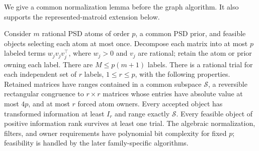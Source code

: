 We give a common normalization lemma before the graph algorithm. It also
supports the represented-matroid extension below.
\begin{lemma}
\label{lem:spectral-normalization}
Consider $m$ rational PSD atoms of order $p$, a common PSD prior, and feasible
objects selecting each atom at most once. Decompose each matrix into at most
$p$ labeled terms $w_jv_jv_j^\top$, where $w_j>0$ and $v_j$ are rational;
retain the atom or prior owning each label. There are $M\le p(m+1)$ labels.
There is a rational trial for each independent set of $r$ labels,
$1\le r\le p$, with the following properties. Retained matrices have ranges contained in a
common subspace $\mathcal S$, a reversible rectangular congruence to
$r\times r$ matrices whose entries have absolute value at most $4p$, and
at most $r$ forced atom owners. Every accepted object has transformed
information at least $I_r$ and range exactly $\mathcal S$. Every feasible
object of positive information rank survives at least one trial.
The algebraic normalization, filters, and owner requirements have polynomial
bit complexity for fixed $p$; feasibility is handled by the later
family-specific algorithms.
\end{lemma}
